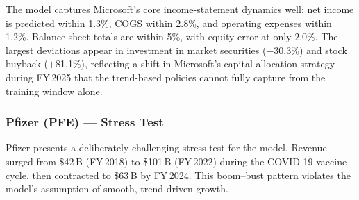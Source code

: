 \documentclass[12pt,a4paper]{article}
\begin{document}
The model captures Microsoft's core income-statement dynamics well: net income
is predicted within 1.3\%, COGS within 2.8\%, and operating expenses within
1.2\%. Balance-sheet totals are within 5\%, with equity error at only 2.0\%.
The largest deviations appear in investment in market securities ($-$30.3\%)
and stock buyback ($+$81.1\%), reflecting a shift in Microsoft's
capital-allocation strategy during FY\,2025 that the trend-based policies
cannot fully capture from the training window alone.

\subsubsection{Pfizer (PFE) --- Stress Test}

Pfizer presents a deliberately challenging stress test for the model. Revenue
surged from \$42\,B (FY\,2018) to \$101\,B (FY\,2022) during the COVID-19
vaccine cycle, then contracted to \$63\,B by FY\,2024. This boom--bust pattern
violates the model's assumption of smooth, trend-driven growth.
\end{document}
